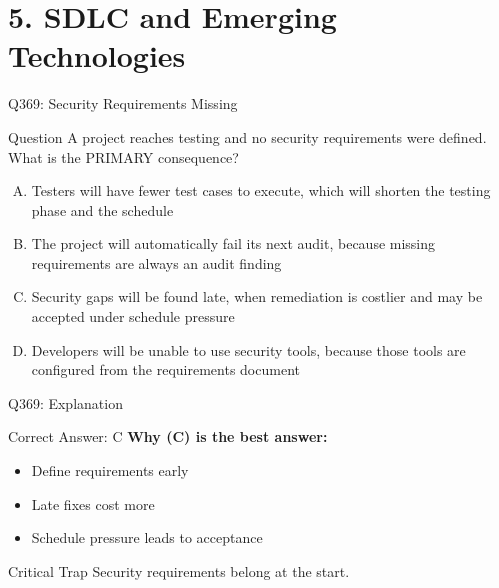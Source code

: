 \documentclass{beamer}
\begin{document}
	\section{5. SDLC and Emerging Technologies}
	
	\begin{frame}{Q369: Security Requirements Missing}
		\begin{block}{Question}
			\small A project reaches testing and no security requirements were defined. What is the PRIMARY consequence?
		\end{block}
		\begin{enumerate}[(A)]
			\footnotesize
			\item Testers will have fewer test cases to execute, which will shorten the testing phase and the schedule
			\item The project will automatically fail its next audit, because missing requirements are always an audit finding
			\item Security gaps will be found late, when remediation is costlier and may be accepted under schedule pressure
			\item Developers will be unable to use security tools, because those tools are configured from the requirements document
		\end{enumerate}
	\end{frame}
	
	\begin{frame}{Q369: Explanation}
		\begin{block}{Correct Answer: C}
			\textbf{Why (C) is the best answer:}
			\begin{itemize}
				\item Define requirements early
				\item Late fixes cost more
				\item Schedule pressure leads to acceptance
			\end{itemize}
		\end{block}
		\begin{alertblock}{Critical Trap}
			Security requirements belong at the start.
		\end{alertblock}
	\end{frame}
	
\end{document}
